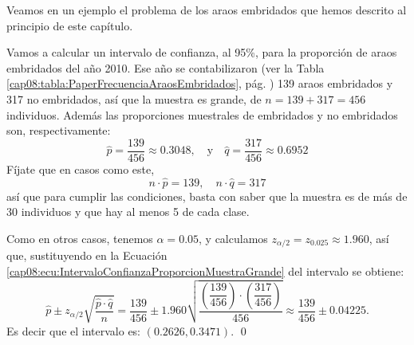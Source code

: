     \begin{center}
    \end{center}

Veamos en un ejemplo el problema de los araos embridados que hemos descrito al principio de este
capítulo.
\begin{ejemplo}\label{cap08:ejem:IntervaloConfianzaProporcionAraos}
Vamos a calcular un intervalo de confianza, al 95\%, para la proporción de araos embridados del año
2010. Ese año se contabilizaron (ver la Tabla \ref{cap08:tabla:PaperFrecuenciaAraosEmbridados},
pág. \pageref{cap08:tabla:PaperFrecuenciaAraosEmbridados}) 139 araos embridados y 317 no
embridados, así que la muestra es grande, de $n=139+317=456$ individuos. Además las proporciones
muestrales de embridados y no embridados son, respectivamente:
\[\hat p=\dfrac{139}{456}\approx 0.3048,\quad\mbox{y}\quad\hat q=\dfrac{317}{456}\approx 0.6952\]
Fíjate que en casos como este,
\[n\cdot \hat p=139,\quad n\cdot \hat q=317 \]
así que para cumplir las condiciones, basta con saber que la muestra es de más de 30 individuos y
que hay al menos 5 de cada clase.

Como en otros casos, tenemos $\alpha=0.05$, y calculamos $z_{\alpha/2}=z_{0.025}\approx 1.960$, así
que, sustituyendo en la Ecuación \ref{cap08:ecu:IntervaloConfianzaProporcionMuestraGrande} del
intervalo se obtiene:
    \[
    \hat p \pm z_{\alpha/2}\sqrt{\dfrac{\hat p\cdot \hat q}{n}}=
    \dfrac{139}{456}\pm 1.960\sqrt{\dfrac{\left(\dfrac{139}{456}\right)\cdot\left(\dfrac{317}{456}\right)}{456}}
    \approx \dfrac{139}{456}\pm 0.04225.
    \]
Es decir que el intervalo es: $(0.2626,0.3471)$. \qed
\end{ejemplo}


